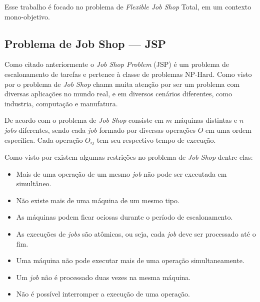         Esse trabalho é focado no problema de \textit{Flexible Job Shop} Total, em um contexto mono-objetivo.


    \subsection{Problema de Job Shop — JSP}
            Como citado anteriormente o \textit{Job Shop Problem} (JSP) é um problema de escalonamento de tarefas e pertence à classe de problemas NP-Hard. Como visto por \cite{Cheng1996} o problema de \textit{Job Shop} chama muita atenção por ser um problema com diversas aplicações no mundo real, e em diversos cenários diferentes, como industria, computação e manufatura.\newline

            De acordo com \cite{Cheng1996} o problema de \textit{Job Shop} consiste em $m$ máquinas distintas e $n$ \textit{jobs} diferentes, sendo cada \textit{job} formado por diversas operações $O$ em uma ordem específica. Cada operação $O_{ij}$ tem seu respectivo tempo de execução.\newline

            Como visto por \cite{Bagchi1999} existem algumas restrições no problema de \textit{Job Shop} dentre elas:
            \begin{itemize}
                \item Mais de uma operação de um mesmo \textit{job} não pode ser executada em simultâneo.
                \item Não existe mais de uma máquina de um mesmo tipo.
                \item As máquinas podem ficar ociosas durante o período de escalonamento.
                \item As execuções de \textit{jobs} são atômicas, ou seja, cada \textit{job} deve ser processado até o fim.
                \item Uma máquina não pode executar mais de uma operação simultaneamente.
                \item Um \textit{job} não é processado duas vezes na mesma máquina.
                \item Não é possível interromper a execução de uma operação.
            \end{itemize}
        
